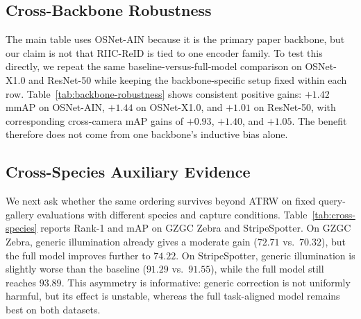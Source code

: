 \documentclass[sigconf,screen,review,anonymous]{acmart}
\begin{document}
\subsection{Cross-Backbone Robustness}

The main table uses OSNet-AIN because it is the primary paper backbone, but
our claim is not that RIIC-ReID is tied to one encoder family.
To test this directly, we repeat the same baseline-versus-full-model comparison on
OSNet-X1.0 and ResNet-50 while keeping the backbone-specific setup fixed within
each row.
Table~\ref{tab:backbone-robustness} shows consistent positive gains:
$+1.42$ mmAP on OSNet-AIN, $+1.44$ on OSNet-X1.0, and $+1.01$ on ResNet-50,
with corresponding cross-camera mAP gains of $+0.93$, $+1.40$, and $+1.05$.
The benefit therefore does not come from one backbone's inductive bias alone.

\begin{table}[t]
  \caption{ATRW cross-backbone robustness under matched within-backbone
  protocols.}
  \label{tab:backbone-robustness}
  \centering
  \small
  \setlength{\tabcolsep}{3pt}
\end{table}

\subsection{Cross-Species Auxiliary Evidence}

We next ask whether the same ordering survives beyond ATRW on fixed
query-gallery evaluations with different species and capture conditions.
Table~\ref{tab:cross-species} reports Rank-1 and mAP on GZGC Zebra and
StripeSpotter.
On GZGC Zebra, generic illumination already gives a moderate gain
($72.71$ vs.\ $70.32$), but the full model improves further to $74.22$.
On StripeSpotter, generic illumination is slightly worse than the
baseline ($91.29$ vs.\ $91.55$), while the full model still reaches
$93.89$.
This asymmetry is informative: generic correction is not uniformly harmful, but
its effect is unstable, whereas the full task-aligned model remains best on
both datasets.
\end{document}
